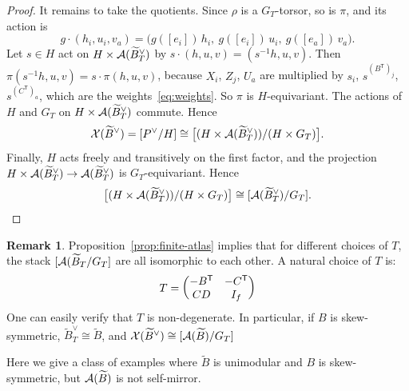 \documentclass[12pt, letter]{amsart}
\theoremstyle{definition}
\newtheorem{remark}[dummy]{Remark}
\begin{document}
\begin{proof}
It remains to take the quotients.
Since $\rho$ is a $G_T$-torsor, so is $\pi$, and its action is
\[
 g\cdot(h_i,u_i,v_a)=\bigl(g([e_i])\,h_i,\ g([e_i])\,u_i,\ g([e_a])\,v_a\bigr).
\]
Let $s\in H$ act on $H\times \mathcal{A}(\widetilde B_T^\vee)$ by $s\cdot(h,u,v)=(s^{-1}h,u,v)$.
Then $\pi(s^{-1}h,u,v)=s\cdot\pi(h,u,v)$, because $X_i$, $Z_j$, $U_a$ are multiplied by $s_i$, $s^{(B^{\mathsf T})_j}$, $s^{(C^{\mathsf T})_a}$, which are the weights~\eqref{eq:weights}.
So $\pi$ is $H$-equivariant.
The actions of $H$ and $G_T$ on $H\times \mathcal{A}(\widetilde B_T^\vee)$ commute.
Hence
\[
 \mathcal{X}(\widetilde B^\vee)=[P^\vee/H]\cong\bigl[(H\times \mathcal{A}(\widetilde B_T^\vee))/(H\times G_T)\bigr].
\]
Finally, $H$ acts freely and transitively on the first factor, and the projection $H\times \mathcal{A}(\widetilde B_T^\vee)\to \mathcal{A}(\widetilde B_T^\vee)$ is $G_T$-equivariant.
Hence
\[
 \bigl[(H\times \mathcal{A}(\widetilde B_T^\vee))/(H\times G_T)\bigr]\cong[\mathcal{A}(\widetilde B_T^\vee)/G_T].
\]
\end{proof}

\begin{remark}
    Proposition~\ref{prop:finite-atlas} implies that for different choices of \(T\), the stack \([ \mathcal{A}(\widetilde B_T/G_T]\) are all isomorphic to each other. 
    A natural choice of \(T\) is:
    \[
    T =
    \begin{pmatrix}
        -B^\mathsf T & -C^\mathsf T \\
        CD & I_f
    \end{pmatrix}
    \]
    One can easily verify that \(T\) is non-degenerate. In particular, if \(B\) is skew-symmetric, \(\widetilde B_T^\vee \cong \widetilde B\), and \(\mathcal{X} (\widetilde B^\vee) \cong [\mathcal{A}(\widetilde B)/G_T]\) 
\end{remark}

Here we give a class of examples where \(\widetilde B\) is unimodular and \(B\) is skew-symmetric, but \(\mathcal{A}(\widetilde B)\) is not self-mirror. 
\end{document}
